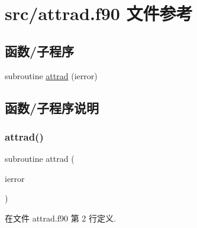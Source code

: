 \hypertarget{attrad_8f90}{}\section{src/attrad.f90 文件参考}
\label{attrad_8f90}
\subsection*{函数/子程序}
\begin{DoxyCompactItemize}
\item 
subroutine \mbox{\hyperlink{attrad_8f90_a4fa1f1b692c675790ac5e649a5729a24}{attrad}} (ierror)
\end{DoxyCompactItemize}


\subsection{函数/子程序说明}
\mbox{\label{attrad_8f90_a4fa1f1b692c675790ac5e649a5729a24}} 
\subsubsection{\texorpdfstring{attrad()}{attrad()}}
{\footnotesize\ttfamily subroutine attrad (\begin{DoxyParamCaption}\item[{}]{ierror }\end{DoxyParamCaption})}



在文件 attrad.\+f90 第 2 行定义.

